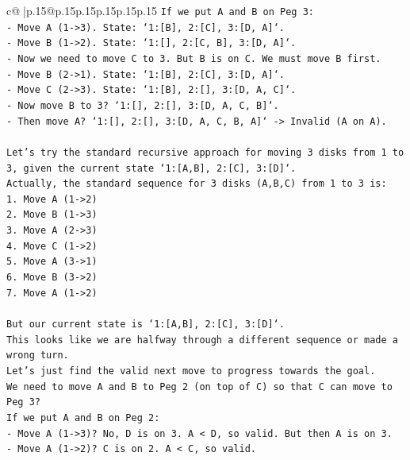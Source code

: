 \documentclass{article}
\begin{document}
{\begin{supertabular}{c@{$\;$}|p{.15\linewidth}@{}p{.15\linewidth}p{.15\linewidth}p{.15\linewidth}p{.15\linewidth}p{.15\linewidth}}
{{{\texttt{If we put A and B on Peg 3:} \\
\texttt{{-} Move A (1{-}>3). State: `1:{[}B{]}, 2:{[}C{]}, 3:{[}D, A{]}`.} \\
\texttt{{-} Move B (1{-}>2). State: `1:{[}{]}, 2:{[}C, B{]}, 3:{[}D, A{]}`.} \\
\texttt{{-} Now we need to move C to 3. But B is on C. We must move B first.} \\
\texttt{{-} Move B (2{-}>1). State: `1:{[}B{]}, 2:{[}C{]}, 3:{[}D, A{]}`.} \\
\texttt{{-} Move C (2{-}>3). State: `1:{[}B{]}, 2:{[}{]}, 3:{[}D, A, C{]}`.} \\
\texttt{{-} Now move B to 3? `1:{[}{]}, 2:{[}{]}, 3:{[}D, A, C, B{]}`.} \\
\texttt{{-} Then move A? `1:{[}{]}, 2:{[}{]}, 3:{[}D, A, C, B, A{]}` {-}> Invalid (A on A).} \\
\\ 
\texttt{Let's try the standard recursive approach for moving 3 disks from 1 to 3, given the current state `1:{[}A,B{]}, 2:{[}C{]}, 3:{[}D{]}`.} \\
\texttt{Actually, the standard sequence for 3 disks (A,B,C) from 1 to 3 is:} \\
\texttt{1. Move A (1{-}>2)} \\
\texttt{2. Move B (1{-}>3)} \\
\texttt{3. Move A (2{-}>3)} \\
\texttt{4. Move C (1{-}>2)} \\
\texttt{5. Move A (3{-}>1)} \\
\texttt{6. Move B (3{-}>2)} \\
\texttt{7. Move A (1{-}>2)} \\
\\ 
\texttt{But our current state is `1:{[}A,B{]}, 2:{[}C{]}, 3:{[}D{]}`.} \\
\texttt{This looks like we are halfway through a different sequence or made a wrong turn.} \\
\texttt{Let's just find the valid next move to progress towards the goal.} \\
\texttt{We need to move A and B to Peg 2 (on top of C) so that C can move to Peg 3?} \\
\texttt{If we put A and B on Peg 2:} \\
\texttt{{-} Move A (1{-}>3)? No, D is on 3. A < D, so valid. But then A is on 3.} \\
\texttt{{-} Move A (1{-}>2)? C is on 2. A < C, so valid.} \\
}}}
\end{supertabular}}
\end{document}
